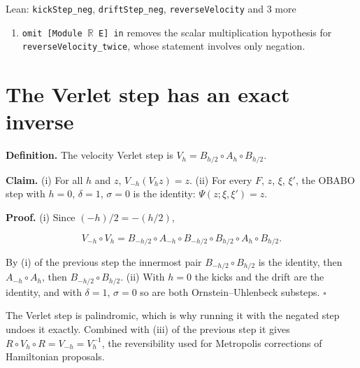 \documentclass[11pt,a4paper]{article}
\begin{document}
\begin{leanbox}{Lean: \texttt{kickStep\_\allowbreak{}neg}, \texttt{driftStep\_\allowbreak{}neg}, \texttt{reverseVelocity} and 3 more}
\begin{enumerate}
\item \texttt{omit [Module \ensuremath{\mathbb R} E] in} removes the scalar multiplication hypothesis for \texttt{reverse\allowbreak{}Velocity\_\allowbreak{}twice}, whose statement involves only negation.

\end{enumerate}
\end{leanbox}

\section{\texorpdfstring{The Verlet step has an exact inverse}{The Verlet step has an exact inverse}}


\textbf{Definition.} The velocity Verlet step is \(V_h=B_{h/2}\circ A_h\circ B_{h/2}\).




\textbf{Claim.} (i) For all \(h\) and \(z\), \(V_{-h}(V_hz)=z\).
(ii) For every \(F\), \(z\), \(\xi\), \(\xi'\), the OBABO step with \(h=0\), \(\delta=1\), \(\sigma=0\) is the identity: \(\Psi(z;\xi,\xi')=z\).




\textbf{Proof.} (i) Since \((-h)/2=-(h/2)\),


\[V_{-h}\circ V_h=B_{-h/2}\circ A_{-h}\circ B_{-h/2}\circ B_{h/2}\circ A_h\circ B_{h/2}.\]


By (i) of the previous step the innermost pair \(B_{-h/2}\circ B_{h/2}\) is the identity, then \(A_{-h}\circ A_h\), then \(B_{-h/2}\circ B_{h/2}\). (ii) With \(h=0\) the kicks and the drift are the identity, and with \(\delta=1\), \(\sigma=0\) so are both Ornstein–Uhlenbeck substeps. \(\square\)




The Verlet step is palindromic, which is why running it with the negated step undoes it exactly. Combined with (iii) of the previous step it gives \(R\circ V_h\circ R=V_{-h}=V_h^{-1}\), the reversibility used for Metropolis corrections of Hamiltonian proposals.
\end{document}

